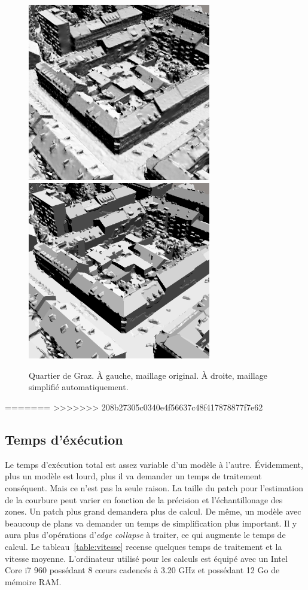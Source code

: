 ﻿\documentclass[12pt, twoside]{article}
\begin{document}
\begin{figure}[h]
\centering
\includegraphics[width=8cm,keepaspectratio]{Graz.png} \includegraphics[width=8cm,keepaspectratio]{GrazAuto.png} 
\caption{Quartier de Graz. À gauche, maillage original. À droite, maillage simplifié automatiquement.}
\end{figure}

=======
>>>>>>> 208b27305c0340e4f56637c48f417878877f7e62
\subsection{Temps d'éxécution}
Le temps d'exécution total est assez variable d'un modèle à l'autre. Évidemment, plus un modèle est lourd, plus il va demander un temps de traitement conséquent. Mais ce n'est pas la seule raison. La taille du patch pour l'estimation de la courbure peut varier en fonction de la précision et l'échantillonage des zones. Un patch plus grand demandera plus de calcul. De même, un modèle avec beaucoup de plans va demander un temps de simplification plus important. Il y aura plus d'opérations d'\textit{edge collapse} à traiter, ce qui augmente le temps de calcul. Le tableau~\ref{table:vitesse} recense quelques temps de traitement et la vitesse moyenne. L'ordinateur utilisé pour les calculs est équipé avec un Intel Core i7 960 possédant 8 c\oe{}urs cadencés à 3.20 GHz et possédant 12 Go de mémoire RAM.
\end{document}
